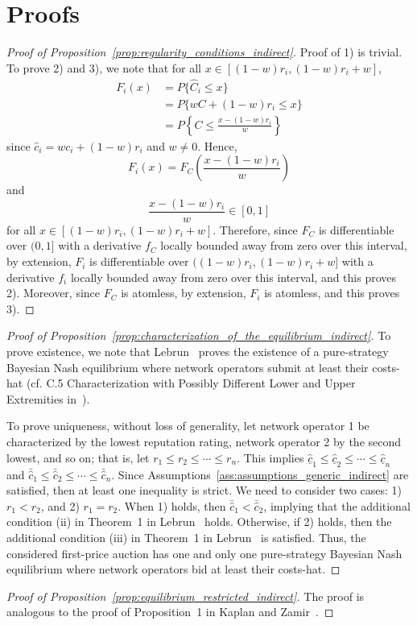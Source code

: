 \section{Proofs}
\label{sec:proofs_indirect}
\begin{proof}[Proof of Proposition~\ref{prop:regularity_conditions_indirect}]
Proof of 1) is trivial. To prove 2) and 3), we note that for all $x\in [(1-w)r_i, (1-w)r_i + w]$,
\begin{align*}
  F_i(x)
  &= P\{\hat{C}_i\le x\} \\
  &= P\{wC + (1-w)r_i\le x\} \\
  &= P\left\{ C\le \frac{x - (1-w)r_i}{w} \right\}
\end{align*}
since $\hat{c}_i = wc_i + (1-w)r_i$ and $w\neq 0$. Hence,
\begin{equation*}
  F_i(x) = F_C\left( \frac{x - (1-w)r_i}{w} \right)
\end{equation*}
and
\begin{equation*}
  \frac{x - (1-w)r_i}{w}\in [0,1]
\end{equation*}
for all $x\in [(1-w)r_i, (1-w)r_i + w]$. Therefore, since $F_C$ is differentiable over $(0,1]$ with a derivative $f_C$ locally bounded away from zero over this interval, by extension, $F_i$ is differentiable over $((1-w)r_i, (1-w)r_i + w]$ with a derivative $f_i$ locally bounded away from zero over this interval, and this proves 2). Moreover, since $F_C$ is atomless, by extension, $F_i$ is atomless, and this proves 3).
\end{proof}

\begin{proof}[Proof of Proposition~\ref{prop:characterization_of_the_equilibrium_indirect}]
To prove existence, we note that Lebrun~\cite{Lebrun2006} proves the existence of a pure-strategy Bayesian Nash equilibrium where network operators submit at least their costs-hat (cf. C.5 Characterization with Possibly Different Lower and Upper Extremities in~\cite{Lebrun2006}).

To prove uniqueness, without loss of generality, let network operator 1 be characterized by the lowest reputation rating, network operator 2 by the second lowest, and so on; that is, let $r_1 \leq r_2 \leq\cdots \leq r_n$. This implies $\underline{\hat{c}}_1 \leq \underline{\hat{c}}_2 \leq\cdots \leq \underline{\hat{c}}_n$ and $\bar{\hat{c}}_1 \leq \bar{\hat{c}}_2 \leq \cdots\leq \bar{\hat{c}}_n$. Since Assumptions~\ref{ass:assumptions_generic_indirect} are satisfied, then at least one inequality is strict. We need to consider two cases: 1) $r_1 < r_2$, and 2) $r_1 = r_2$. When 1) holds, then $\bar{\hat{c}}_1 < \bar{\hat{c}}_2$, implying that the additional condition (ii) in Theorem~1 in Lebrun~\cite{Lebrun2006} holds. Otherwise, if 2) holds, then the additional condition (iii) in Theorem~1 in Lebrun~\cite{Lebrun2006} is satisfied. Thus, the considered first-price auction has one and only one pure-strategy Bayesian Nash equilibrium where network operators bid at least their costs-hat.
\end{proof}

\begin{proof}[Proof of Proposition~\ref{prop:equilibrium_restricted_indirect}]
The proof is analogous to the proof of Proposition~1 in Kaplan and Zamir~\cite{KaplanZamir2007}.
\end{proof}
